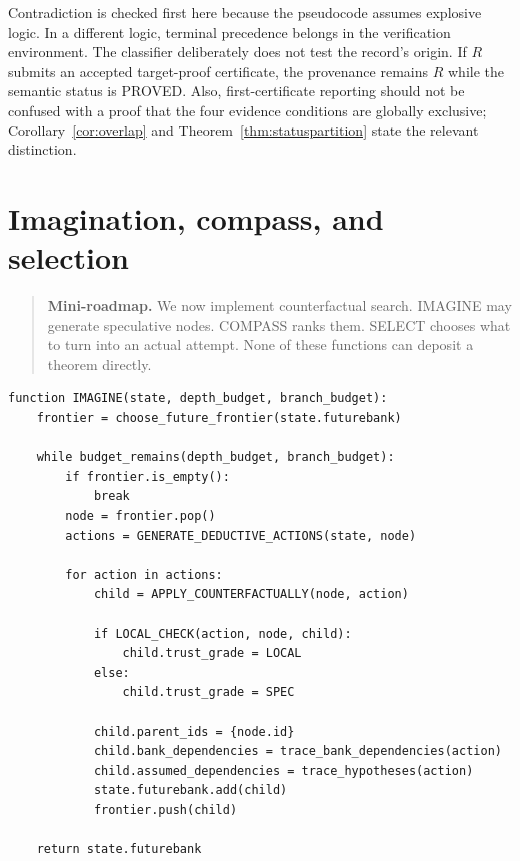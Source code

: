 \documentclass[11pt,openany]{book}
\theoremstyle{definition}
\theoremstyle{remark}
\newenvironment{miniroadmap}{\begin{quote}\small\color{deepblue}\textbf{Mini-roadmap.} }{\end{quote}}
\begin{document}
Contradiction is checked first here because the pseudocode assumes explosive logic. In a different logic, terminal precedence belongs in the verification environment. The classifier deliberately does not test the record's origin. If $R$ submits an accepted target-proof certificate, the provenance remains $R$ while the semantic status is \textsf{PROVED}. Also, first-certificate reporting should not be confused with a proof that the four evidence conditions are globally exclusive; Corollary~\ref{cor:overlap} and Theorem~\ref{thm:statuspartition} state the relevant distinction.

\chapter{Imagination, compass, and selection}
\begin{miniroadmap}
We now implement counterfactual search. IMAGINE may generate speculative nodes. COMPASS ranks them. SELECT chooses what to turn into an actual attempt. None of these functions can deposit a theorem directly.
\end{miniroadmap}

\begin{lstlisting}[style=pseudo,caption={Graded imagination}]
function IMAGINE(state, depth_budget, branch_budget):
    frontier = choose_future_frontier(state.futurebank)

    while budget_remains(depth_budget, branch_budget):
        if frontier.is_empty():
            break
        node = frontier.pop()
        actions = GENERATE_DEDUCTIVE_ACTIONS(state, node)

        for action in actions:
            child = APPLY_COUNTERFACTUALLY(node, action)

            if LOCAL_CHECK(action, node, child):
                child.trust_grade = LOCAL
            else:
                child.trust_grade = SPEC

            child.parent_ids = {node.id}
            child.bank_dependencies = trace_bank_dependencies(action)
            child.assumed_dependencies = trace_hypotheses(action)
            state.futurebank.add(child)
            frontier.push(child)

    return state.futurebank
\end{lstlisting}
\end{document}
